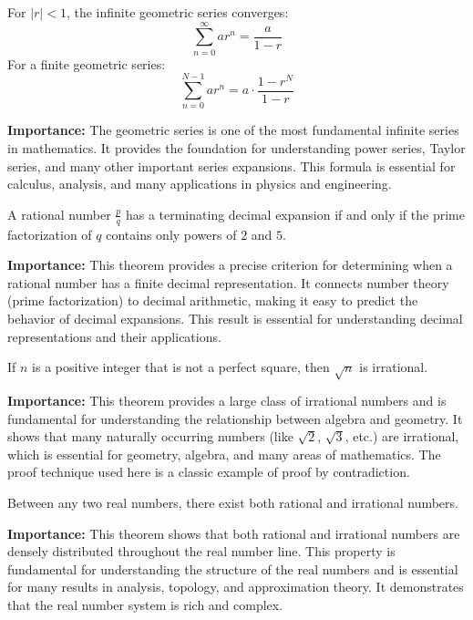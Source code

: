 \begin{theorem}
For $|r| < 1$, the infinite geometric series converges:
\[
\sum_{n=0}^{\infty} ar^n = \frac{a}{1-r}
\]
For a finite geometric series:
\[
\sum_{n=0}^{N-1} ar^n = a \cdot \frac{1-r^N}{1-r}
\]
\end{theorem}

\noindent\textbf{Importance:} The geometric series is one of the most fundamental infinite series in mathematics. It provides the foundation for understanding power series, Taylor series, and many other important series expansions. This formula is essential for calculus, analysis, and many applications in physics and engineering.

\begin{theorem}
A rational number $\frac{p}{q}$ has a terminating decimal expansion if and only if the prime factorization of $q$ contains only powers of $2$ and $5$.
\end{theorem}

\noindent\textbf{Importance:} This theorem provides a precise criterion for determining when a rational number has a finite decimal representation. It connects number theory (prime factorization) to decimal arithmetic, making it easy to predict the behavior of decimal expansions. This result is essential for understanding decimal representations and their applications.


\begin{theorem}
If $n$ is a positive integer that is not a perfect square, then $\sqrt{n}$ is irrational.
\end{theorem}

\noindent\textbf{Importance:} This theorem provides a large class of irrational numbers and is fundamental for understanding the relationship between algebra and geometry. It shows that many naturally occurring numbers (like $\sqrt{2}$, $\sqrt{3}$, etc.) are irrational, which is essential for geometry, algebra, and many areas of mathematics. The proof technique used here is a classic example of proof by contradiction.



\begin{theorem}
Between any two real numbers, there exist both rational and irrational numbers.
\end{theorem}

\noindent\textbf{Importance:} This theorem shows that both rational and irrational numbers are densely distributed throughout the real number line. This property is fundamental for understanding the structure of the real numbers and is essential for many results in analysis, topology, and approximation theory. It demonstrates that the real number system is rich and complex.





